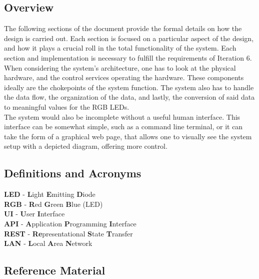 \documentclass[onecolumn, draftclsnofoot,10pt, compsoc]{IEEEtran}
\begin{document}
		\subsection{Overview}
		The following sections of the document provide the formal details on how the design is carried out. Each section is focused on a particular aspect of the
		design, and how it plays a crucial roll in the total functionality of the system. Each section and implementation is necessary to fulfill the requirements of
		Iteration 6.\\

		\noindent When considering the system's architecture, one has to look at the physical hardware, and the control services operating the hardware. These components
		ideally are the chokepoints of the system function. The system also has to handle the data flow, the organization of the data, and lastly, the
		conversion of said data to meaningful values for the RGB LEDs.\\

		\noindent The system would also be incomplete without a useful human interface. This interface can be somewhat simple, such as a command line terminal, or it can
		take the form of a graphical web page, that allows one to visually see the system setup with a depicted diagram, offering more control.


		\subsection{Definitions and Acronyms}
		\textbf{LED} - \textbf{L}ight \textbf{E}mitting \textbf{D}iode
		\\\textbf{RGB} - \textbf{R}ed \textbf{G}reen \textbf{B}lue (LED)
		\\\textbf{UI} - \textbf{U}ser \textbf{I}nterface
		\\\textbf{API} - \textbf{A}pplication \textbf{P}rogramming \textbf{I}nterface
		\\\textbf{REST} - \textbf{Re}presentational \textbf{S}tate \textbf{T}ransfer
		\\\textbf{LAN} - \textbf{L}ocal \textbf{A}rea \textbf{N}etwork


		\subsection{Reference Material}
			\begingroup
				\renewcommand{\addcontentsline}[3]{}%
				\renewcommand{\section}[2]{}%
				
				
			\endgroup
\end{document}
